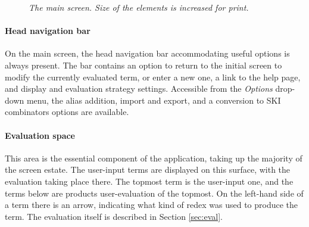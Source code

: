 \documentclass[table, a4paper, 10pt]{book}
\begin{document}
\begin{center}
\begin{figure}[H]\centering
{}
\caption{\textit{The main screen. Size of the elements is increased for print.}}\label{mainscrfig}
\end{figure}
\end{center}

\paragraph{Head navigation bar}
On the main screen, the head navigation bar accommodating useful options is always present.
The bar contains an option to return to the initial screen to modify the currently evaluated term,
or enter a new one, a link to the help page, and display and evaluation strategy settings.
Accessible from the \textit{Options} drop-down menu, the alias addition, import and export, and
a conversion to SKI combinators options are available.

\paragraph{Evaluation space}
This area is the essential component of the application, taking up the majority
of the screen estate. The user-input terms are displayed on this surface, with the
evaluation taking place there. The topmost term is the user-input one,
and the terms below are products user-evaluation of the topmost. On the left-hand
side of a term there is an arrow, indicating what kind of redex was used to produce
the term. The evaluation itself is described in Section \ref{sec:eval}.
\end{document}
